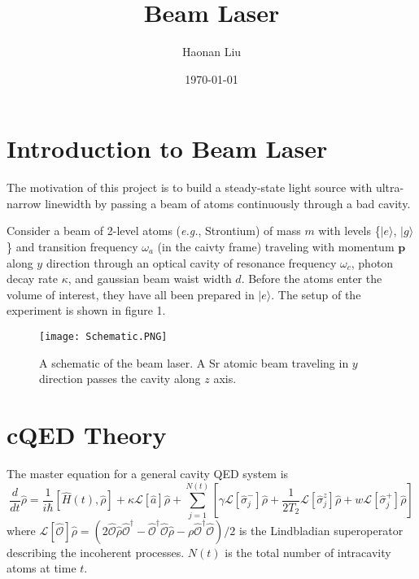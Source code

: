 \documentclass{article}
\title{Beam Laser}
\author{Haonan Liu}
\date{\today}
\newcommand{\gc}{\Gamma_C}
\newcommand{\lindblad}{\mathcal{L}}
\newcommand{\ope}{\hat{\mathcal{O}}}
\newcommand{\estate}{|e\rangle}
\newcommand{\gstate}{|g\rangle}
\begin{document}
\maketitle
\section{Introduction to Beam Laser}
The motivation of this project is to build a steady-state light source with ultra-narrow linewidth by passing a beam of atoms continuously through a bad cavity. 


Consider a beam of 2-level atoms (\textit{e.g.}, Strontium) of mass $m$ with levels \{$\estate$, $\gstate$\} and transition frequency $\omega_a$ (in the caivty frame) traveling with momentum $\textbf{p}$ along $y$ direction through an optical cavity of resonance frequency $\omega_c$, photon decay rate $\kappa$, and gaussian beam waist width $d$. %
Before the atoms enter the volume of interest, they have all been prepared in $|e\rangle$. The setup of the experiment is shown in figure 1. 
\begin{figure}[h]
\centering
\texttt{[image: Schematic.PNG]}
\caption{A schematic of the beam laser. A Sr atomic beam traveling in $y$ direction passes the cavity along $z$ axis.}
\label{fig:beamLaser}
\end{figure}


\section{cQED Theory}
The master equation for a general cavity QED system is
\begin{equation}
\label{masterqed}
\frac{d}{dt}\hat{\rho}=\frac{1}{i\hbar}\left[\hat{H}(t),\hat{\rho}\right]+\kappa\lindblad[\hat{a}]\hat{\rho}+\sum^{N(t)}_{j=1}\left[\gamma \lindblad[\hat{\sigma}^-_j]\hat{\rho}+\frac{1}{2T_2}\lindblad[\hat{\sigma}^z_j]\hat{\rho}+w\lindblad[\hat{\sigma}^+_j]\hat{\rho}\right]
\end{equation}
where $\lindblad[\ope]\hat{\rho} = (2\ope\hat{\rho}\ope^\dagger-\ope^\dagger\ope\hat{\rho}-\rho\ope^\dagger\ope)/2$ is the Lindbladian superoperator describing the incoherent processes. $N(t)$ is the total number of intracavity atoms at time $t$. 
\end{document}
